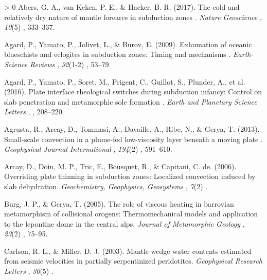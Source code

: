 \documentclass[draft,linenumbers]{agujournal2018} %
\newlength{\cslhangindent} %
\newenvironment{CSLReferences}[3] %
 {%
  \setlength{\parindent}{0pt} %
  \ifodd #1 \everypar{\setlength{\hangindent}{\cslhangindent}}\ignorespaces\fi %
  \ifnum #2 > 0 %
  \setlength{\parskip}{#2\baselineskip} %
  \fi %
 }%
 {} %
\providecommand{\DIFaddtex}[1]{{\protect\color{blue} \sf #1}} %
\providecommand{\DIFadd}[1]{\texorpdfstring{\DIFaddtex{#1}}{#1}} %
\begin{document}
\hypertarget{refs}{}
\begin{CSLReferences}{1}{0}
\leavevmode\hypertarget{ref-Abers2017}{}%
\DIFadd{Abers, G. A., van Keken, P. E., \& Hacker, B. R. (2017). }{\DIFadd{The cold and
relatively dry nature of mantle forearcs in subduction zones}}\DIFadd{.
}\emph{\DIFadd{Nature Geoscience}}\DIFadd{, }\emph{10}(5)\DIFadd{, 333--337.
}

\leavevmode\hypertarget{ref-Agard2009}{}%
\DIFadd{Agard, P., Yamato, P., Jolivet, L., \& Burov, E. (2009). }{\DIFadd{Exhumation of
oceanic blueschists and eclogites in subduction zones: Timing and
mechanisms}}\DIFadd{. }\emph{\DIFadd{Earth-Science Reviews}}\DIFadd{, }\emph{92}(1-2)\DIFadd{, 53--79.
}

\leavevmode\hypertarget{ref-Agard2016}{}%
\DIFadd{Agard, P., Yamato, P., Soret, M., Prigent, C., Guillot, S., Plunder, A.,
et al. (2016). }{\DIFadd{Plate interface rheological switches during subduction
infancy: Control on slab penetration and metamorphic sole formation}}\DIFadd{.
}\emph{\DIFadd{Earth and Planetary Science Letters}}\DIFadd{, }\emph{\DIFadd{451}}\DIFadd{, 208--220.
}

\leavevmode\hypertarget{ref-Agrusta2013}{}%
\DIFadd{Agrusta, R., Arcay, D., Tommasi, A., Davaille, A., Ribe, N., \& Gerya,
T. (2013). }{\DIFadd{Small-scale convection in a plume-fed low-viscosity layer
beneath a moving plate}}\DIFadd{. }\emph{\DIFadd{Geophysical Journal International}}\DIFadd{,
}\emph{194}(2)\DIFadd{, 591--610.
}

\leavevmode\hypertarget{ref-Arcay2006}{}%
\DIFadd{Arcay, D., Doin, M. P., Tric, E., Bousquet, R., \& Capitani, C. de.
(2006). Overriding plate thinning in subduction zones: Localized
convection induced by slab dehydration. }\emph{\DIFadd{Geochemistry, Geophysics,
Geosystems}}\DIFadd{, }\emph{7}(2)\DIFadd{.
}

\leavevmode\hypertarget{ref-Burg2005}{}%
\DIFadd{Burg, J. P., \& Gerya, T. (2005). The role of viscous heating in
barrovian metamorphism of collisional orogens: Thermomechanical models
and application to the lepontine dome in the central alps. }\emph{\DIFadd{Journal
of Metamorphic Geology}}\DIFadd{, }\emph{23}(2)\DIFadd{, 75--95.
}

\leavevmode\hypertarget{ref-Carlson2003}{}%
\DIFadd{Carlson, R. L., \& Miller, D. J. (2003). Mantle wedge water contents
estimated from seismic velocities in partially serpentinized
peridotites. }\emph{\DIFadd{Geophysical Research Letters}}\DIFadd{, }\emph{30}(5)\DIFadd{.
}


\end{CSLReferences}
\end{document}
